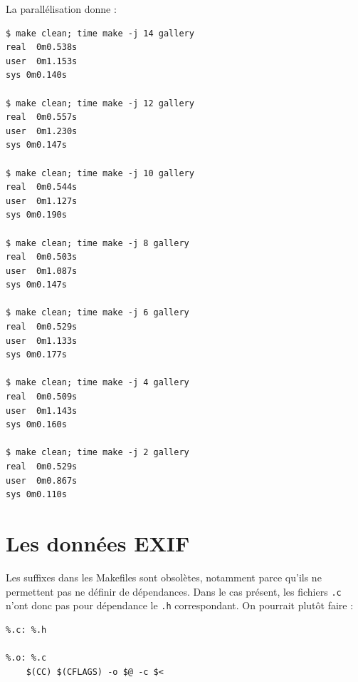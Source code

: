 \documentclass[a4paper,11pt]{article}
\begin{document}
La parallélisation donne :

\begin{verbatim}
$ make clean; time make -j 14 gallery
real  0m0.538s
user  0m1.153s
sys 0m0.140s

$ make clean; time make -j 12 gallery
real  0m0.557s
user  0m1.230s
sys 0m0.147s

$ make clean; time make -j 10 gallery
real  0m0.544s
user  0m1.127s
sys 0m0.190s

$ make clean; time make -j 8 gallery
real  0m0.503s
user  0m1.087s
sys 0m0.147s

$ make clean; time make -j 6 gallery
real  0m0.529s
user  0m1.133s
sys 0m0.177s

$ make clean; time make -j 4 gallery
real  0m0.509s
user  0m1.143s
sys 0m0.160s

$ make clean; time make -j 2 gallery
real  0m0.529s
user  0m0.867s
sys 0m0.110s
\end{verbatim}

\section{Les données EXIF}

Les suffixes dans les Makefiles sont obsolètes, notamment parce qu'ils ne permettent pas ne
définir de dépendances. Dans le cas présent, les fichiers \verb+.c+ n'ont donc
pas pour dépendance le \verb+.h+ correspondant. On pourrait plutôt faire :

\begin{verbatim}
%.c: %.h

%.o: %.c
	$(CC) $(CFLAGS) -o $@ -c $<
\end{verbatim}

\end{document}
